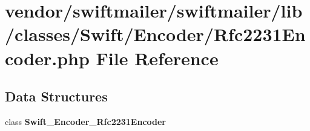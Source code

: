 \section{vendor/swiftmailer/swiftmailer/lib/classes/\+Swift/\+Encoder/\+Rfc2231\+Encoder.php File Reference}
\label{_rfc2231_encoder_8php}
\subsection*{Data Structures}
\begin{DoxyCompactItemize}
\item 
class {\bf Swift\+\_\+\+Encoder\+\_\+\+Rfc2231\+Encoder}
\end{DoxyCompactItemize}

